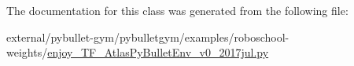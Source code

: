 The documentation for this class was generated from the following file\+:\begin{DoxyCompactItemize}
\item 
external/pybullet-\/gym/pybulletgym/examples/roboschool-\/weights/\hyperlink{enjoy___t_f___atlas_py_bullet_env__v0__2017jul_8py}{enjoy\+\_\+\+T\+F\+\_\+\+Atlas\+Py\+Bullet\+Env\+\_\+v0\+\_\+2017jul.\+py}\end{DoxyCompactItemize}
